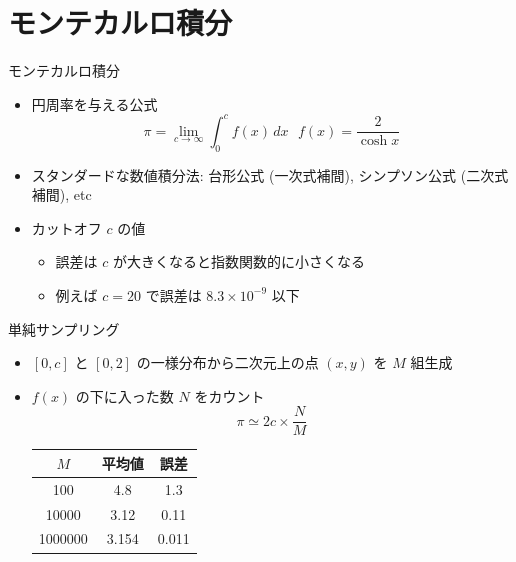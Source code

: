 \section{モンテカルロ積分}

\begin{frame}[t,fragile]{モンテカルロ積分}
  \begin{itemize}
    \setlength{\itemsep}{1em}
  \item 円周率を与える公式
    \[
    \pi = \lim_{c \rightarrow \infty} \int_0^c f(x) \, dx \ \ \ f(x) = \frac{2}{\cosh x}
    \]
  \item スタンダードな数値積分法: 台形公式 (一次式補間), シンプソン公式 (二次式補間), etc
  \item カットオフ $c$ の値
    \begin{itemize}
    \item 誤差は $c$ が大きくなると指数関数的に小さくなる
    \item 例えば $c = 20$ で誤差は $8.3 \times 10^{-9}$ 以下
    \end{itemize}
  \end{itemize}
\end{frame}

\begin{frame}[t,fragile]{単純サンプリング}
  \begin{itemize}
    \setlength{\itemsep}{1em}
  \item $[0,c]$ と $[0,2]$ の一様分布から二次元上の点 $(x,y)$ を $M$ 組生成
  \item $f(x)$ の下に入った数 $N$ をカウント
    \[
    \pi \simeq 2c \times \frac{N}{M}
    \]
    \begin{tabular}{|c|c|c|}
      \hline
      $M$ & 平均値 & 誤差 \\
      \hline
      100 & 4.8 & 1.3 \\
      10000 & 3.12 & 0.11 \\
      1000000 & 3.154 & 0.011 \\
      \hline
    \end{tabular}
  \end{itemize}
  \vspace*{-7em}
  \hspace*{17em}
\end{frame}

